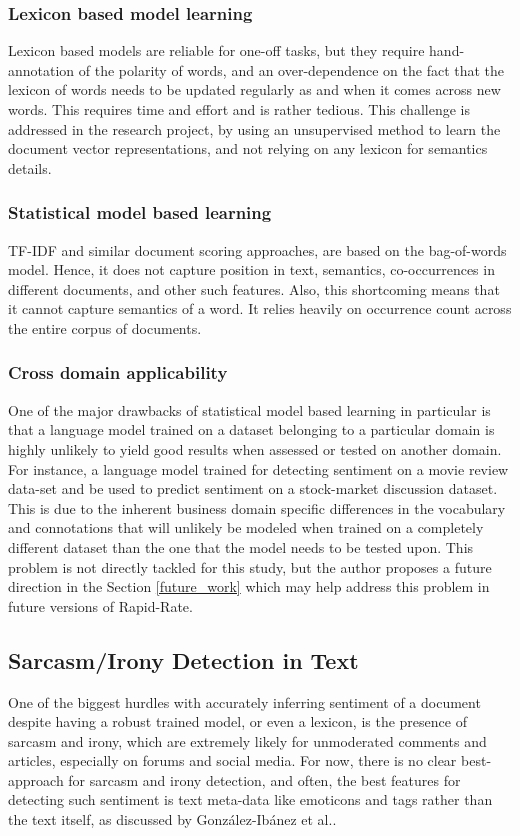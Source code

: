 \documentclass[conference]{IEEEtran}
\begin{document}
        \subsubsection{Lexicon based model learning}
            Lexicon based models are reliable for one-off tasks, but they require hand-annotation of the polarity of words, and an over-dependence on the fact that the lexicon of words needs to be updated regularly as and when it comes across new words. 
            This requires time and effort and is rather tedious. 
            This challenge is addressed in the research project, by using an unsupervised method to learn the document vector representations, and not relying on any lexicon for semantics details.

        \subsubsection{Statistical model based learning}
            TF-IDF and similar document scoring approaches, are based on the bag-of-words model. Hence, it does not capture position in text, semantics, co-occurrences in different documents, and other such features. Also, this shortcoming means that it cannot capture semantics of a word. It relies heavily on occurrence count across the entire corpus of documents.

        \subsubsection{Cross domain applicability} \label{cross_domain_applicability}
            One of the major drawbacks of statistical model based learning in particular is that a language model trained on a dataset belonging to a particular domain is highly unlikely to yield good results when assessed or tested on another domain. 
            For instance, a language model trained for detecting sentiment on a movie review data-set and be used to predict sentiment on a stock-market discussion dataset. 
            This is due to the inherent business domain specific differences in the vocabulary and connotations that will unlikely be modeled when trained on a completely different dataset than the one that the model needs to be tested upon. 
            This problem is not directly tackled for this study, but the author proposes a future direction in the Section \ref{future_work} which may help address this problem in future versions of Rapid-Rate.

    \subsection{Sarcasm/Irony Detection in Text}
        One of the biggest hurdles with accurately inferring sentiment of a document despite having a robust trained model, or even a lexicon, is the presence of sarcasm and irony, which are extremely likely for unmoderated comments and articles, especially on forums and social media. 
        For now, there is no clear best-approach for sarcasm and irony detection, and often, the best features for detecting such sentiment is text meta-data like emoticons and tags rather than the text itself, as discussed by Gonz{\'a}lez-Ib{\'a}nez et al.\cite{gonzalez2011identifying}.
\end{document}
